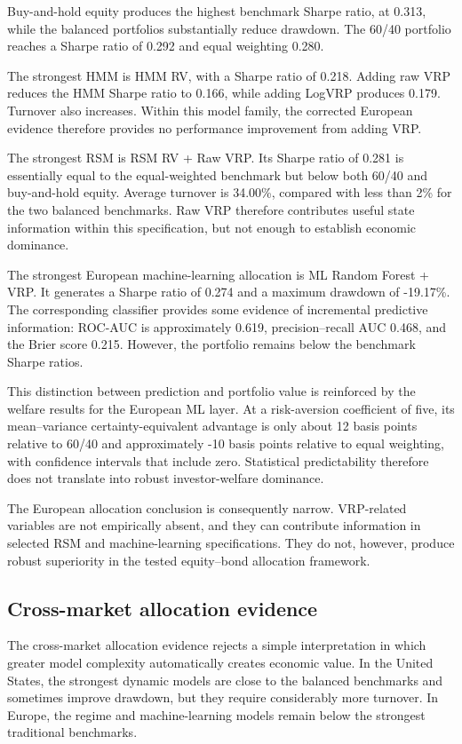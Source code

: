 Buy-and-hold equity produces the highest benchmark Sharpe ratio, at 0.313, while the balanced portfolios substantially reduce drawdown. The 60/40 portfolio reaches a Sharpe ratio of 0.292 and equal weighting 0.280.

The strongest HMM is HMM RV, with a Sharpe ratio of 0.218. Adding raw VRP reduces the HMM Sharpe ratio to 0.166, while adding LogVRP produces 0.179. Turnover also increases. Within this model family, the corrected European evidence therefore provides no performance improvement from adding VRP.

The strongest RSM is RSM RV + Raw VRP. Its Sharpe ratio of 0.281 is essentially equal to the equal-weighted benchmark but below both 60/40 and buy-and-hold equity. Average turnover is 34.00\%, compared with less than 2\% for the two balanced benchmarks. Raw VRP therefore contributes useful state information within this specification, but not enough to establish economic dominance.

The strongest European machine-learning allocation is ML Random Forest + VRP. It generates a Sharpe ratio of 0.274 and a maximum drawdown of -19.17\%. The corresponding classifier provides some evidence of incremental predictive information: ROC-AUC is approximately 0.619, precision--recall AUC 0.468, and the Brier score 0.215. However, the portfolio remains below the benchmark Sharpe ratios.

This distinction between prediction and portfolio value is reinforced by the welfare results for the European ML layer. At a risk-aversion coefficient of five, its mean--variance certainty-equivalent advantage is only about 12 basis points relative to 60/40 and approximately -10 basis points relative to equal weighting, with confidence intervals that include zero. Statistical predictability therefore does not translate into robust investor-welfare dominance.

The European allocation conclusion is consequently narrow. VRP-related variables are not empirically absent, and they can contribute information in selected RSM and machine-learning specifications. They do not, however, produce robust superiority in the tested equity--bond allocation framework.

\subsection{Cross-market allocation evidence}

The cross-market allocation evidence rejects a simple interpretation in which greater model complexity automatically creates economic value. In the United States, the strongest dynamic models are close to the balanced benchmarks and sometimes improve drawdown, but they require considerably more turnover. In Europe, the regime and machine-learning models remain below the strongest traditional benchmarks.

